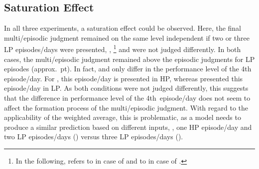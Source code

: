 \subsection{Saturation Effect}\label{pred:saturation}
In all three experiments, a saturation effect could be observed.
Here, the final multi\-/episodic judgment remained on the same level independent if two or three \ac{LP} episodes/days were presented, \ie, \footnote{In the following,  refers to \CVb{} in case of  and to \CVa{} in case of \EIIa{}.
} and  were not judged differently.
In both cases, the multi\-/episodic judgment remained above the episodic judgments for \ac{LP} episodes (approx.~\unit[1]{pt}).
In fact,  and  only differ in the performance level of the 4th episode/day.
For , this episode/day is presented in \ac{HP}, whereas  presented this episode/day in \ac{LP}.
As both conditions were not judged differently, this suggests that the difference in performance level of the 4th~episode/day does not seem to affect the formation process of the multi\-/episodic judgment.
%
With regard to the applicability of the weighted average, this is problematic, as a model needs to produce a similar prediction based on different inputs, \ie, one \ac{HP} episode/day and two \ac{LP} episodes/days () versus three \ac{LP} episodes/days ().
